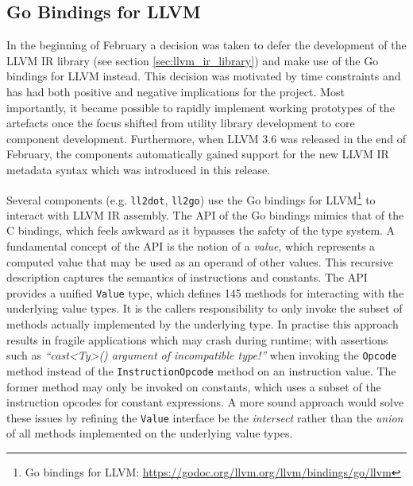 
\subsection{Go Bindings for LLVM}
\label{sec:go_bindings_for_llvm}

In the beginning of February a decision was taken to defer the development of the LLVM IR library (see section \ref{sec:llvm_ir_library}) and make use of the Go bindings for LLVM instead. This decision was motivated by time constraints and has had both positive and negative implications for the project. Most importantly, it became possible to rapidly implement working prototypes of the artefacts once the focus shifted from utility library development to core component development. Furthermore, when LLVM 3.6 was released in the end of February, the components automatically gained support for the new LLVM IR metadata syntax which was introduced in this release.

Several components (e.g. \texttt{ll2dot}, \texttt{ll2go}) use the Go bindings for LLVM\footnote{Go bindings for LLVM: \url{https://godoc.org/llvm.org/llvm/bindings/go/llvm}} to interact with LLVM IR assembly. The API of the Go bindings mimics that of the C bindings, which feels awkward as it bypasses the safety of the type system. A fundamental concept of the API is the notion of a \textit{value}, which represents a computed value that may be used as an operand of other values. This recursive description captures the semantics of instructions and constants. The API provides a unified \texttt{Value} type, which defines 145 methods for interacting with the underlying value types. It is the callers responsibility to only invoke the subset of methods actually implemented by the underlying type. In practise this approach results in fragile applications which may crash during runtime; with assertions such as \textit{``cast<Ty>() argument of incompatible type!''} when invoking the \texttt{Opcode} method instead of the \texttt{InstructionOpcode} method on an instruction value. The former method may only be invoked on constants, which uses a subset of the instruction opcodes for constant expressions. A more sound approach would solve these issues by refining the \texttt{Value} interface be the \textit{intersect} rather than the \textit{union} of all methods implemented on the underlying value types.

